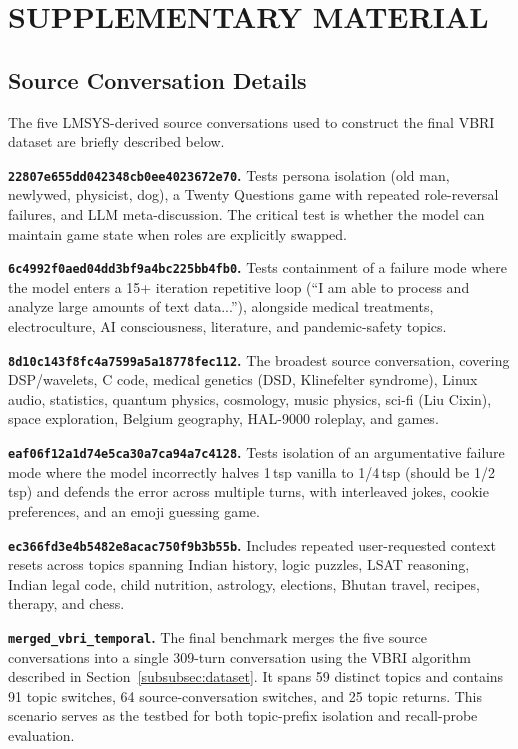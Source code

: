 \chapter{SUPPLEMENTARY MATERIAL}\label{ch:appendix}
\vspace{-3em}

\section{Source Conversation Details}\label{secA1}
The five LMSYS-derived source conversations used to construct the final VBRI dataset are briefly described below.

\textbf{\texttt{22807e655dd042348cb0ee4023672e70}.} Tests persona isolation (old man, newlywed, physicist, dog), a Twenty Questions game with repeated role-reversal failures, and LLM meta-discussion. The critical test is whether the model can maintain game state when roles are explicitly swapped.

\textbf{\texttt{6c4992f0aed04dd3bf9a4bc225bb4fb0}.} Tests containment of a failure mode where the model enters a 15+ iteration repetitive loop (``I am able to process and analyze large amounts of text data...''), alongside medical treatments, electroculture, AI consciousness, literature, and pandemic-safety topics.

\textbf{\texttt{8d10c143f8fc4a7599a5a18778fec112}.} The broadest source conversation, covering DSP/wavelets, C code, medical genetics (DSD, Klinefelter syndrome), Linux audio, statistics, quantum physics, cosmology, music physics, sci-fi (Liu Cixin), space exploration, Belgium geography, HAL-9000 roleplay, and games.

\textbf{\texttt{eaf06f12a1d74e5ca30a7ca94a7c4128}.} Tests isolation of an argumentative failure mode where the model incorrectly halves 1\,tsp vanilla to 1/4\,tsp (should be 1/2\,tsp) and defends the error across multiple turns, with interleaved jokes, cookie preferences, and an emoji guessing game.

\textbf{\texttt{ec366fd3e4b5482e8acac750f9b3b55b}.} Includes repeated user-requested context resets across topics spanning Indian history, logic puzzles, LSAT reasoning, Indian legal code, child nutrition, astrology, elections, Bhutan travel, recipes, therapy, and chess.

\textbf{\texttt{merged\_vbri\_temporal}.} The final benchmark merges the five source conversations into a single 309-turn conversation using the VBRI algorithm described in Section~\ref{subsubsec:dataset}. It spans 59 distinct topics and contains 91 topic switches, 64 source-conversation switches, and 25 topic returns. This scenario serves as the testbed for both topic-prefix isolation and recall-probe evaluation.

